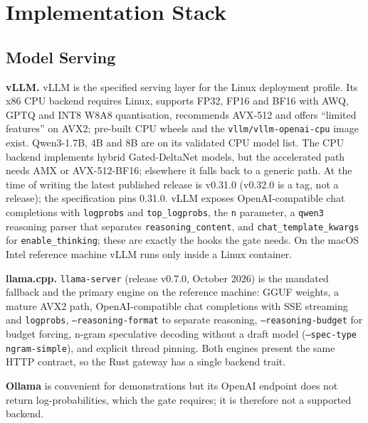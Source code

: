 \section{Implementation Stack}
\label{sec:stack}

\subsection{Model Serving}
\textbf{vLLM.} vLLM \cite{kwon2023pagedattention} is the specified serving
layer for the Linux deployment profile. Its x86 CPU backend requires Linux,
supports FP32, FP16 and BF16 with AWQ, GPTQ and INT8 W8A8 quantisation,
recommends AVX-512 and offers ``limited features'' on AVX2; pre-built CPU
wheels and the \texttt{vllm/vllm-openai-cpu} image exist. Qwen3-1.7B, 4B and
8B are on its validated CPU model list. The CPU backend implements hybrid
Gated-DeltaNet models, but the accelerated path needs AMX or AVX-512-BF16;
elsewhere it falls back to a generic path. At the time of writing the latest
published release is v0.31.0 (v0.32.0 is a tag, not a release); the
specification pins 0.31.0. vLLM exposes OpenAI-compatible chat completions
with \texttt{logprobs} and \texttt{top\_logprobs}, the \texttt{n} parameter,
a \texttt{qwen3} reasoning parser that separates \texttt{reasoning\_content},
and \texttt{chat\_template\_kwargs} for \texttt{enable\_thinking}; these are
exactly the hooks the gate needs. On the macOS Intel reference machine vLLM
runs only inside a Linux container.

\textbf{llama.cpp.} \texttt{llama-server} (release v0.7.0, October 2026) is
the mandated fallback and the primary engine on the reference machine: GGUF
weights, a mature AVX2 path, OpenAI-compatible chat completions with SSE
streaming and \texttt{logprobs}, \texttt{--reasoning-format} to separate
reasoning, \texttt{--reasoning-budget} for budget forcing, n-gram speculative
decoding without a draft model (\texttt{--spec-type ngram-simple}), and
explicit thread pinning. Both engines present the same HTTP contract, so the
Rust gateway has a single backend trait.

\textbf{Ollama} is convenient for demonstrations but its OpenAI endpoint does
not return log-probabilities, which the gate requires; it is therefore not a
supported backend.

